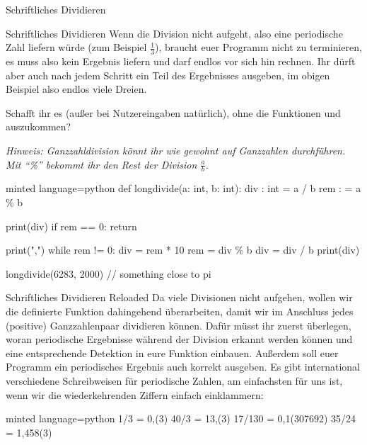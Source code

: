 \begin{task}[points=auto]{Schriftliches Dividieren}
\begin{subtask*}[points=0]{Schriftliches Dividieren }
        Wenn die Division nicht aufgeht, also eine periodische Zahl liefern würde (zum Beispiel $\frac13$), braucht euer Programm nicht zu terminieren, es muss also kein Ergebnis liefern und darf endlos vor sich hin rechnen.
        Ihr dürft aber auch nach jedem Schritt ein Teil des Ergebnisses ausgeben,
        im obigen Beispiel also endlos viele Dreien.

        Schafft ihr es (außer bei Nutzereingaben natürlich), ohne die Funktionen
         und  auszukommen?

        \textit{Hinweis: Ganzzahldivision könnt ihr wie gewohnt auf Ganzzahlen durchführen.
            Mit \enquote{\%} bekommt ihr den Rest der Division $\frac{a}{b}$.}

        \begin{solution}
            \begin{codeBlock}[]{minted language=python}
                def longdivide(a: int, b: int):
                    div : int = a / b
                    rem : = a \% b

                    print(div)
                    if rem == 0:
                        return

                    print(",")
                    while rem != 0:
                        div = rem * 10
                        rem = div \% b
                        div = div / b
                        print(div)

                longdivide(6283, 2000) // something close to pi
            \end{codeBlock}
        \end{solution}
    \end{subtask*}
    \begin{subtask*}[points=0]{Schriftliches Dividieren Reloaded }
        Da viele Divisionen nicht aufgehen, wollen wir die definierte Funktion dahingehend überarbeiten, damit wir im Anschluss jedes (positive) Ganzzahlenpaar dividieren können.
        Dafür müsst ihr zuerst überlegen, woran periodische Ergebnisse während der Division erkannt werden können und eine entsprechende Detektion in eure Funktion einbauen.
        Außerdem soll euer Programm ein periodisches Ergebnis auch korrekt ausgeben. Es gibt international verschiedene Schreibweisen für periodische Zahlen, am einfachsten für uns ist, wenn wir die wiederkehrenden Ziffern einfach einklammern:
        \begin{codeBlock}[]{minted language=python}
            1/3 = 0,(3)
            40/3 = 13,(3)
            17/130 = 0,1(307692)
            35/24 = 1,458(3)
        \end{codeBlock}


\end{subtask*}
\end{task}
